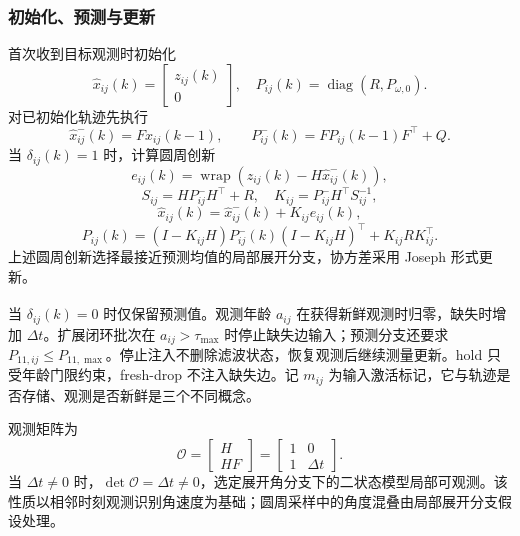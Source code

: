 \documentclass[UTF8,fontset=windows,11pt]{ctexart}
\newcommand{\upcite}[1]{\textsuperscript{\cite{#1}}}
\begin{document}
\subsubsection{初始化、预测与更新}
首次收到目标观测时初始化
\begin{equation}
 \hat x_{ij}(k)=\begin{bmatrix}z_{ij}(k)\\0\end{bmatrix},
 \quad P_{ij}(k)=\operatorname{diag}(R,P_{\omega,0}).
\end{equation}
对已初始化轨迹先执行
\begin{equation}
 \hat x^-_{ij}(k)=F\hat x_{ij}(k-1),\qquad
 P^-_{ij}(k)=FP_{ij}(k-1)F^\top+Q.
\end{equation}
当 $\delta_{ij}(k)=1$ 时，计算圆周创新
\begin{equation}
 e_{ij}(k)=\operatorname{wrap}\left(z_{ij}(k)-H\hat x^-_{ij}(k)\right),
\end{equation}
\begin{equation}
 S_{ij}=HP^-_{ij}H^\top+R,\quad K_{ij}=P^-_{ij}H^\top S_{ij}^{-1},
\end{equation}
\begin{equation}
 \hat x_{ij}(k)=\hat x^-_{ij}(k)+K_{ij}e_{ij}(k),
\end{equation}
\begin{equation}
 P_{ij}(k)=(I-K_{ij}H)P^-_{ij}(k)(I-K_{ij}H)^\top+K_{ij}RK_{ij}^\top.
\end{equation}
上述圆周创新选择最接近预测均值的局部展开分支，协方差采用 Joseph 形式更新。

当 $\delta_{ij}(k)=0$ 时仅保留预测值\upcite{Sinopoli2004}。观测年龄 $a_{ij}$ 在获得新鲜观测时归零，缺失时增加 $\Delta t$。扩展闭环批次在 $a_{ij}>\tau_{\max}$ 时停止缺失边输入；预测分支还要求 $P_{11,ij}\le P_{11,\max}$。停止注入不删除滤波状态，恢复观测后继续测量更新。hold 只受年龄门限约束，fresh-drop 不注入缺失边。记 $m_{ij}$ 为输入激活标记，它与轨迹是否存储、观测是否新鲜是三个不同概念。

观测矩阵为
\begin{equation}
 \mathcal O=\begin{bmatrix}H\\HF\end{bmatrix}=\begin{bmatrix}1&0\\1&\Delta t\end{bmatrix}.
\end{equation}
当 $\Delta t\ne0$ 时，$\det\mathcal O=\Delta t\ne0$，选定展开角分支下的二状态模型局部可观测。该性质以相邻时刻观测识别角速度为基础；圆周采样中的角度混叠由局部展开分支假设处理。
\end{document}
